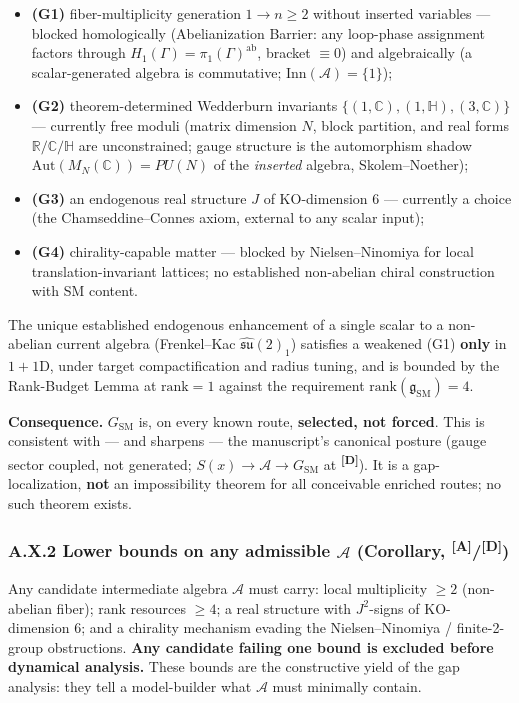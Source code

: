 \documentclass[12pt,a4paper,twoside]{article}
\theoremstyle{plain}
\theoremstyle{definition}
\theoremstyle{remark}
\newcommand{\catmark}[1]{\textsuperscript{\textsf{\textbf{[#1]}}}}
\begin{document}
\begin{itemize}
\item \textbf{(G1)} fiber-multiplicity generation $1\to n\geq 2$ without inserted variables — blocked homologically (Abelianization Barrier: any loop-phase assignment factors through $H_1(\Gamma)=\pi_1(\Gamma)^{\mathrm{ab}}$, bracket $\equiv 0$) and algebraically (a scalar-generated algebra is commutative; $\mathrm{Inn}(\mathcal{A})=\{1\}$);
\item \textbf{(G2)} theorem-determined Wedderburn invariants $\{(1,\mathbb{C}),(1,\mathbb{H}),(3,\mathbb{C})\}$ — currently free moduli (matrix dimension $N$, block partition, and real forms $\mathbb{R}/\mathbb{C}/\mathbb{H}$ are unconstrained; gauge structure is the automorphism shadow $\mathrm{Aut}(M_N(\mathbb{C}))=PU(N)$ of the \emph{inserted} algebra, Skolem--Noether);
\item \textbf{(G3)} an endogenous real structure $J$ of KO-dimension 6 — currently a choice (the Chamseddine--Connes axiom, external to any scalar input);
\item \textbf{(G4)} chirality-capable matter — blocked by Nielsen--Ninomiya for local translation-invariant lattices; no established non-abelian chiral construction with SM content.
\end{itemize}

The unique established endogenous enhancement of a single scalar to a non-abelian current algebra (Frenkel--Kac $\widehat{\mathfrak{su}}(2)_1$) satisfies a weakened (G1) \textbf{only} in $1{+}1$D, under target compactification and radius tuning, and is bounded by the Rank-Budget Lemma at $\mathrm{rank}=1$ against the requirement $\mathrm{rank}(\mathfrak{g}_{\mathrm{SM}})=4$.

\textbf{Consequence.} $G_{\mathrm{SM}}$ is, on every known route, \textbf{selected, not forced}. This is consistent with — and sharpens — the manuscript's canonical posture (gauge sector coupled, not generated; $S(x)\to\mathcal{A}\to G_{\mathrm{SM}}$ at \catmark{D}). It is a gap-localization, \textbf{not} an impossibility theorem for all conceivable enriched routes; no such theorem exists.

\subsubsection*{A.X.2 Lower bounds on any admissible $\mathcal{A}$ (Corollary, \catmark{A}/\catmark{D})}

Any candidate intermediate algebra $\mathcal{A}$ must carry: local multiplicity $\geq 2$ (non-abelian fiber); rank resources $\geq 4$; a real structure with $J^2$-signs of KO-dimension 6; and a chirality mechanism evading the Nielsen--Ninomiya / finite-2-group obstructions. \textbf{Any candidate failing one bound is excluded before dynamical analysis.} These bounds are the constructive yield of the gap analysis: they tell a model-builder what $\mathcal{A}$ must minimally contain.
\end{document}
